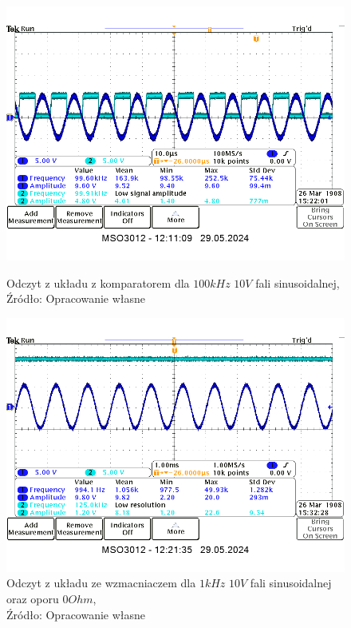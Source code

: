 \documentclass{article}
\begin{document}
  \begin{figure}[!ht]
    \begin{minipage}{.5\textwidth}
      \centering
      \includegraphics[scale=0.35]{grafiki/komparator_100kHz_10V_sin.png}
      \caption{Odczyt z układu z komparatorem dla $100kHz$ $10V$ fali sinusoidalnej,
      \\Źródło: Opracowanie własne}
    \end{minipage}
    \begin{minipage}{.5\textwidth}
      \centering
      \includegraphics[scale=0.35]{grafiki/wzmacniacz_1kHz_10V_sin_0Ohm.png}
      \caption{Odczyt z układu ze wzmacniaczem dla $1kHz$ $10V$ fali sinusoidalnej oraz oporu $0Ohm$,
      \\Źródło: Opracowanie własne}
    \end{minipage}
  \end{figure}
\end{document}
